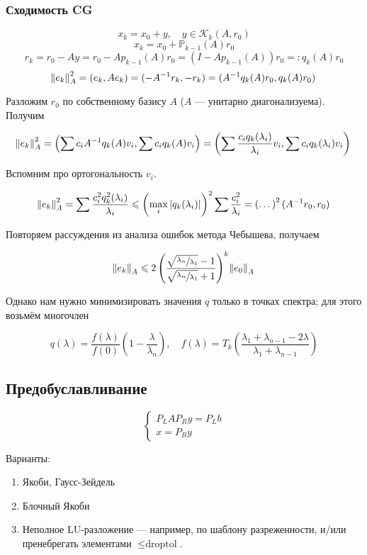 \subsubsection{Сходимость CG}

\[
    x_k = x_0 + y, \quad y \in \mathcal{K}_k(A, r_0)
\]
\[
    x_k = x_0 + \mathbb{P}_{k - 1}(A) r_0
\]
\[
    r_k = r_0 - A y = r_0 - A p_{k - 1}(A) r_0 =
    (I - A p_{k - 1}(A)) r_0 =: q_k(A) r_0
\]
\[
    \norm{e_k}_A^2 = (e_k, A e_k) = (-A^{-1} r_k, -r_k)
    = (A^{-1} q_k(A) r_0, q_k(A) r_0)
\]

Разложим $r_0$ по собственному базису $A$ ($A$ --- унитарно диагонализуема).
Получим

\[
    \norm{e_k}_A^2
    = \left( \sum c_i A^{-1} q_k(A) v_i, \sum c_i q_k(A) v_i \right)
    = \left( \sum \frac{c_i q_k(\lambda_i)}{\lambda_i} v_i,
        \sum c_i q_k(\lambda_i) v_i \right)
\]

Вспомним про ортогональность $v_i$.

\[
    \norm{e_k}_A^2 = \sum \frac{c_i^2 q_k^2(\lambda_i)}{\lambda_i}
    \leqslant \left( \max_i |q_k(\lambda_i)| \right)^2 \sum \frac{c_i^2}{\lambda_i}
    = \left( \dots \right)^2 (A^{-1} r_0, r_0)
\]

Повторяем рассуждения из анализа ошибок метода Чебышева, получаем

\[
    \norm{e_k}_A \leqslant 2 \left( \frac{\sqrt{\sfrac{\lambda_n}{\lambda_1}} - 1}
        {\sqrt{\sfrac{\lambda_n}{\lambda_1}} + 1} \right)^k \norm{e_0}_A
\]

Однако нам нужно минимизировать значения $q$ только в точках спектра; для этого
возьмём многочлен

\[
    q(\lambda) = \frac{f(\lambda)}{f(0)} \left(
        1 - \frac{\lambda}{\lambda_n} \right), \quad
    f(\lambda) = T_k \left( \frac{\lambda_1 + \lambda_{n - 1} - 2 \lambda}{
        \lambda_1 + \lambda_{n - 1}} \right)
\]

\subsection{Предобуславливание}

\[
    \begin{cases}
        P_L A P_R y = P_L b \\
        x = P_R y
    \end{cases}
\]

Варианты:

\begin{enumerate}
    \item Якоби, Гаусс-Зейдель
    \item Блочный Якоби
    \item Неполное LU-разложение --- например, по шаблону разреженности, и/или
        пренебрегать элементами $\le \textrm{droptol}$.
\end{enumerate}


